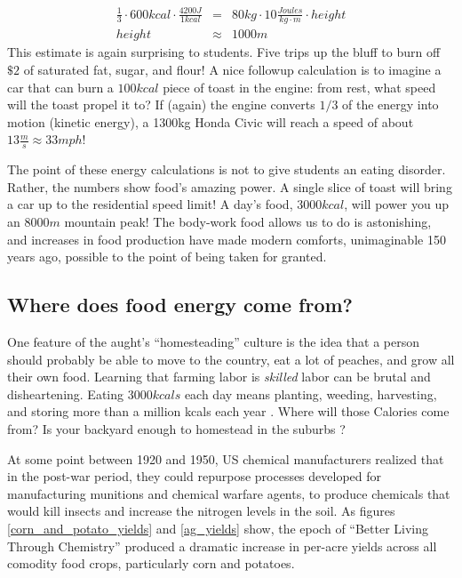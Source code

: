 \documentclass[12pt]{iopart}
\newcommand{\bea}{\begin{eqnarray}}
\newcommand{\eea}{\end{eqnarray}}
\begin{document}
\bea
\frac{1}{3}\cdot600kcal\cdot\frac{4200J}{1kcal} 
	&=& 80kg\cdot10\frac{Joules}{kg\cdot m}\cdot height \label{eq:bar_chart}\\
height &\approx&  1000 m
\eea
This estimate is again surprising to students.  Five trips up the bluff to burn off $\$2$ of saturated fat, sugar, and flour!  A nice followup calculation is to imagine a car that can burn a $100kcal$ piece of toast in the engine: from rest, what speed will the toast propel it to? If (again) the engine converts $1/3$ of the energy into motion (kinetic energy), a 1300kg Honda Civic will reach a speed of about $13\frac{m}{s}\approx33mph$!  

The point of these energy calculations is not to give students an eating disorder.  Rather, the numbers show food's amazing power. A single slice of toast will bring a car up to the residential speed limit!  A day's food, $3000kcal$, will power you up an $8000m$ mountain peak! The body-work food allows us to do is astonishing, and increases in food production have made modern  comforts, unimaginable 150 years ago, possible to the point of being taken for granted.  

\clearpage

\subsection{Where does food energy come from?}
One feature of the aught's ``homesteading'' culture \cite{homesteading} is the idea that a person should probably be able to move to the country, eat a lot of peaches, and grow all their own food.  Learning that farming labor is \textit{skilled} labor can be brutal and disheartening. Eating $3000kcals$ each day means planting, weeding, harvesting, and storing more than a million kcals each year \cite{Haspel}.  Where will those Calories come from? Is your backyard enough to homestead in the suburbs \cite{backyard_homestead}?

At some point between 1920 and 1950, US chemical manufacturers realized that in the post-war period, they could repurpose processes developed for manufacturing munitions and chemical warfare agents, to produce chemicals that would kill insects and increase the nitrogen levels in the soil. 
As figures \ref{corn_and_potato_yields} and \ref{ag_yields} show, the epoch of ``Better Living Through Chemistry'' produced a dramatic increase in per-acre yields across all comodity food crops, particularly corn and potatoes.  
\end{document}
